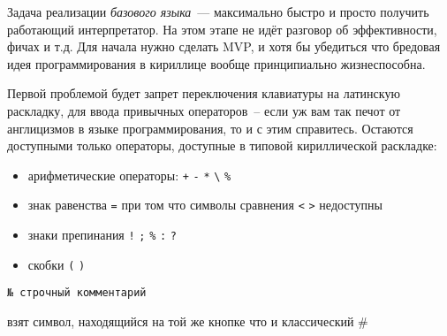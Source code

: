 \clearpage{}\label{core}\secdown

Задача реализации \emph{базового языка}\ --- максимально быстро и просто
получить работающий интерпретатор. На этом этапе не идёт разговор об
эффективности, фичах и т.д. Для начала нужно сделать MVP, и хотя бы убедиться
что бредовая идея программирования в кириллице вообще принципиально
жизнеспособна.

Первой проблемой будет запрет переключения клавиатуры на латинскую раскладку,
для ввода привычных операторов\ -- если уж вам так печот от англицизмов в языке
программирования, то и с этим справитесь. Остаются доступными только операторы,
доступные в типовой кириллической раскладке:
\begin{itemize}[nosep]
    \item арифметические операторы: \verb$+$ \verb$-$ \verb$*$ \verb$\$ \verb$%$
    \item знак равенства \verb$=$ при том что символы сравнения \verb$<$ \verb$>$ недоступны
    \item знаки препинания \verb$!$ \verb$;$ \verb$%$ \verb$:$ \verb$?$
    \item скобки \verb$($ \verb$)$
\end{itemize}


\begin{verbatim}
№ строчный комментарий
\end{verbatim}

взят символ, находящийся на той же кнопке что и классический \#

\secup
